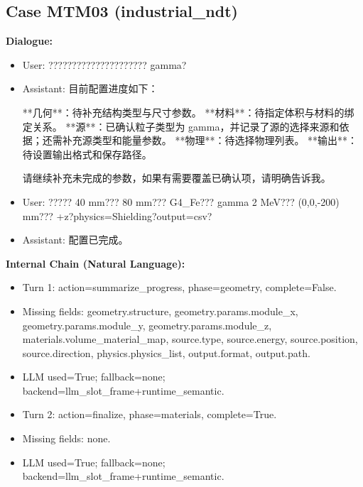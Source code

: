 \documentclass[11pt]{ctexart}
\begin{document}
\subsection{Case MTM03 (industrial\_ndt)}
\textbf{Dialogue:}
\begin{itemize}
\item User: ????????????????????? gamma?
\item Assistant: 目前配置进度如下：

**几何**：待补充结构类型与尺寸参数。  
**材料**：待指定体积与材料的绑定关系。  
**源**：已确认粒子类型为 gamma，并记录了源的选择来源和依据；还需补充源类型和能量参数。  
**物理**：待选择物理列表。  
**输出**：待设置输出格式和保存路径。

请继续补充未完成的参数，如果有需要覆盖已确认项，请明确告诉我。
\item User: ????? 40 mm??? 80 mm??? G4\_Fe??? gamma 2 MeV??? (0,0,-200) mm??? +z?physics=Shielding?output=csv?
\item Assistant: 配置已完成。
\end{itemize}
\textbf{Internal Chain (Natural Language):}
\begin{itemize}
\item Turn 1: action=summarize\_progress, phase=geometry, complete=False.
\item Missing fields: geometry.structure, geometry.params.module\_x, geometry.params.module\_y, geometry.params.module\_z, materials.volume\_material\_map, source.type, source.energy, source.position, source.direction, physics.physics\_list, output.format, output.path.
\item LLM used=True; fallback=none; backend=llm\_slot\_frame+runtime\_semantic.
\item Turn 2: action=finalize, phase=materials, complete=True.
\item Missing fields: none.
\item LLM used=True; fallback=none; backend=llm\_slot\_frame+runtime\_semantic.
\end{itemize}
\end{document}
